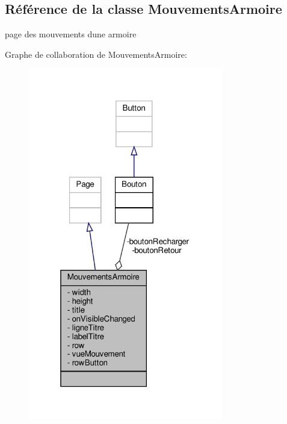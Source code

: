 \hypertarget{class_mouvements_armoire}{}\subsection{Référence de la classe Mouvements\+Armoire}
\label{class_mouvements_armoire}


page des mouvements d\textquotesingle{}une armoire  




Graphe de collaboration de Mouvements\+Armoire\+:\nopagebreak
\begin{figure}[H]
\begin{center}
\leavevmode
\includegraphics[width=241pt]{class_mouvements_armoire__coll__graph}
\end{center}
\end{figure}
